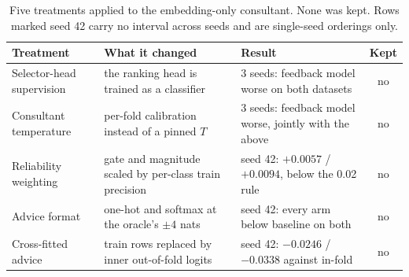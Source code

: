 \begin{table}[htbp]
\centering
\caption[Five prototype-consultant treatments]{Five treatments applied to the embedding-only consultant. None was kept. Rows marked
seed 42 carry no interval across seeds and are single-seed orderings only.}
\label{tab:treatments}
\footnotesize
\begin{tabularx}{\textwidth}{@{}l X X c@{}}
\toprule
Treatment & What it changed & Result & Kept \\
\midrule
Selector-head supervision & the ranking head is trained as a classifier & 3 seeds: feedback model worse on both datasets & no \\
Consultant temperature & per-fold calibration instead of a pinned $T$ & 3 seeds: feedback model worse, jointly with the above & no \\
Reliability weighting & gate and magnitude scaled by per-class train precision & seed 42: $+0.0057$ / $+0.0094$, below the 0.02 rule & no \\
Advice format & one-hot and softmax at the oracle's $\pm 4$ nats & seed 42: every arm below baseline on both & no \\
Cross-fitted advice & train rows replaced by inner out-of-fold logits & seed 42: $-0.0246$ / $-0.0338$ against in-fold & no \\
\bottomrule
\end{tabularx}
\end{table}
